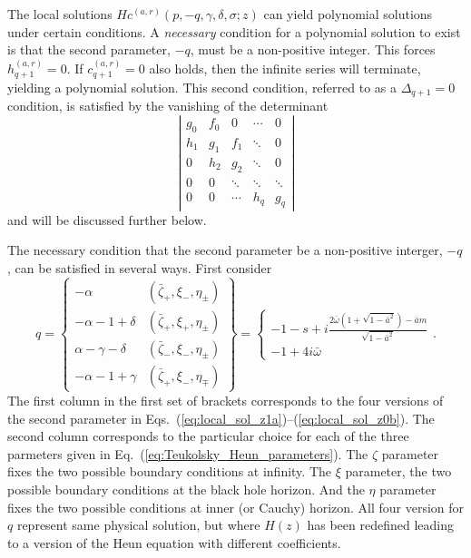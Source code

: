 \documentclass[11pt]{article}
\begin{document}
The local solutions $Hc^{(a,r)}(p,-q,\gamma,\delta,\sigma;z)$ can
yield polynomial solutions under certain conditions.  A {\em
  necessary} condition for a polynomial solution to exist is that the
second parameter, $-q$, must be a non-positive integer.  This forces
$h_{q+1}^{(a,r)}=0$.  If $c_{q+1}^{(a,r)}=0$ also holds, then the
infinite series will terminate, yielding a polynomial solution.  This
second condition, referred to as a $\Delta_{q+1}=0$ condition, is
satisfied by the vanishing of the determinant
\begin{equation}\label{eq:Delta_q_cond}
  \left|\begin{array}{ccccc}
  g_0 & f_0 & 0 & \cdots & 0 \\
  h_1 & g_1 & f_1 & \ddots & 0 \\
  0 & h_2 & g_2 & \ddots & 0 \\
  0 & 0 & \ddots & \ddots & \ddots \\
  0 & 0 & \cdots & h_q & g_q
  \end{array}\right|
\end{equation}
and will be discussed further below.

The necessary condition that the second parameter be a non-positive
interger, $-q$, can be satisfied in several ways.  First consider
\begin{equation}\label{eq:PP_boundary_set}
  q= \left\{\begin{array}{cc}
            -\alpha & (\bar\zeta_+,\xi_\minus,\eta_\pm) \\
            -\alpha-1+\delta & (\bar\zeta_+,\xi_+,\eta_\pm) \\
            \alpha-\gamma-\delta & (\bar\zeta_\minus,\xi_\minus,\eta_\pm) \\
            -\alpha-1+\gamma & (\bar\zeta_+,\xi_\minus,\eta_\mp)
  \end{array}\right\} =\left\{\begin{array}{c}
  -1-s+i\frac{2\bar\omega(1+\sqrt{1-\bar{a}^2})-\bar{a}m}{\sqrt{1-\bar{a}^2}} \\
  -1+4i\bar{\omega}
  \end{array}\right. .
\end{equation}
The first column in the first set of brackets corresponds to the four
versions of the second parameter in
Eqs.~(\ref{eq:local_sol_z1a})--(\ref{eq:local_sol_z0b}).  The second
column corresponds to the particular choice for each of the three
parmeters given in Eq.~(\ref{eq:Teukolsky_Heun_parameters}).  The
$\zeta$ parameter fixes the two possible boundary conditions at
infinity.  The $\xi$ parameter, the two possible boundary conditions
at the black hole horizon.  And the $\eta$ parameter fixes the two
possible conditions at inner (or Cauchy) horizon.  All four version
for $q$ represent same physical solution, but where $H(z)$ has been
redefined leading to a version of the Heun equation with different
coefficients.
\end{document}
